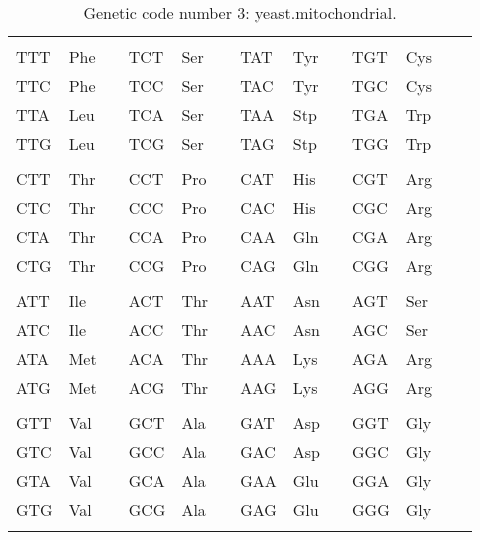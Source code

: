 \begin{table}
\begin{center}
\begin{tabular}{*{13}{l}}
\hline
\\
TTT & Phe &  &
TCT & Ser &  &
TAT & Tyr &  &
TGT & Cys &  &
\\
TTC & Phe &  &
TCC & Ser &  &
TAC & Tyr &  &
TGC & Cys &  &
\\
TTA & Leu &  &
TCA & Ser &  &
TAA & Stp &  &
TGA & Trp &  &
\\
TTG & Leu &  &
TCG & Ser &  &
TAG & Stp &  &
TGG & Trp &  &
\\
\\
CTT & Thr &  &
CCT & Pro &  &
CAT & His &  &
CGT & Arg &  &
\\
CTC & Thr &  &
CCC & Pro &  &
CAC & His &  &
CGC & Arg &  &
\\
CTA & Thr &  &
CCA & Pro &  &
CAA & Gln &  &
CGA & Arg &  &
\\
CTG & Thr &  &
CCG & Pro &  &
CAG & Gln &  &
CGG & Arg &  &
\\
\\
ATT & Ile &  &
ACT & Thr &  &
AAT & Asn &  &
AGT & Ser &  &
\\
ATC & Ile &  &
ACC & Thr &  &
AAC & Asn &  &
AGC & Ser &  &
\\
ATA & Met &  &
ACA & Thr &  &
AAA & Lys &  &
AGA & Arg &  &
\\
ATG & Met &  &
ACG & Thr &  &
AAG & Lys &  &
AGG & Arg &  &
\\
\\
GTT & Val &  &
GCT & Ala &  &
GAT & Asp &  &
GGT & Gly &  &
\\
GTC & Val &  &
GCC & Ala &  &
GAC & Asp &  &
GGC & Gly &  &
\\
GTA & Val &  &
GCA & Ala &  &
GAA & Glu &  &
GGA & Gly &  &
\\
GTG & Val &  &
GCG & Ala &  &
GAG & Glu &  &
GGG & Gly &  &
\\
\\
\hline
\end{tabular}
\caption{Genetic code number 3: yeast.mitochondrial.}
\label{code3.tex}
\end{center}
\end{table}
